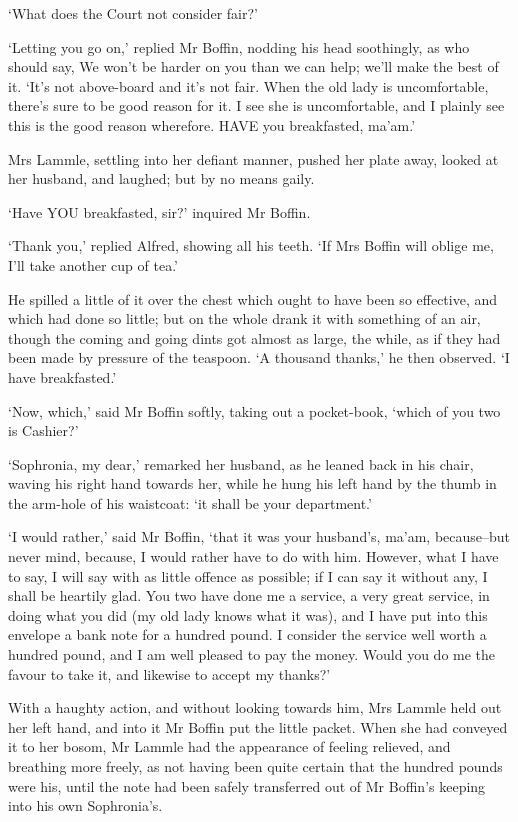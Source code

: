 ‘What does the Court not consider fair?’

‘Letting you go on,’ replied Mr Boffin, nodding his head soothingly, as
who should say, We won’t be harder on you than we can help; we’ll make
the best of it. ‘It’s not above-board and it’s not fair. When the old
lady is uncomfortable, there’s sure to be good reason for it. I see she
is uncomfortable, and I plainly see this is the good reason wherefore.
HAVE you breakfasted, ma’am.’

Mrs Lammle, settling into her defiant manner, pushed her plate away,
looked at her husband, and laughed; but by no means gaily.

‘Have YOU breakfasted, sir?’ inquired Mr Boffin.

‘Thank you,’ replied Alfred, showing all his teeth. ‘If Mrs Boffin will
oblige me, I’ll take another cup of tea.’

He spilled a little of it over the chest which ought to have been so
effective, and which had done so little; but on the whole drank it with
something of an air, though the coming and going dints got almost as
large, the while, as if they had been made by pressure of the teaspoon.
‘A thousand thanks,’ he then observed. ‘I have breakfasted.’

‘Now, which,’ said Mr Boffin softly, taking out a pocket-book, ‘which of
you two is Cashier?’

‘Sophronia, my dear,’ remarked her husband, as he leaned back in his
chair, waving his right hand towards her, while he hung his left hand
by the thumb in the arm-hole of his waistcoat: ‘it shall be your
department.’

‘I would rather,’ said Mr Boffin, ‘that it was your husband’s, ma’am,
because--but never mind, because, I would rather have to do with him.
However, what I have to say, I will say with as little offence as
possible; if I can say it without any, I shall be heartily glad. You two
have done me a service, a very great service, in doing what you did (my
old lady knows what it was), and I have put into this envelope a bank
note for a hundred pound. I consider the service well worth a hundred
pound, and I am well pleased to pay the money. Would you do me the
favour to take it, and likewise to accept my thanks?’

With a haughty action, and without looking towards him, Mrs Lammle held
out her left hand, and into it Mr Boffin put the little packet. When she
had conveyed it to her bosom, Mr Lammle had the appearance of feeling
relieved, and breathing more freely, as not having been quite certain
that the hundred pounds were his, until the note had been safely
transferred out of Mr Boffin’s keeping into his own Sophronia’s.

